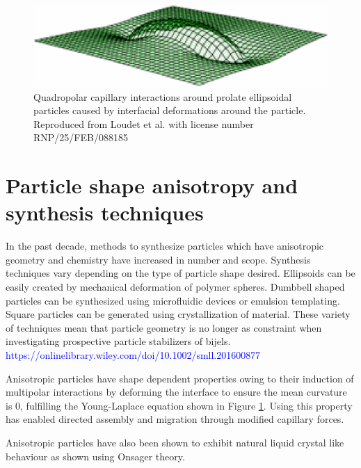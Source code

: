\begin{figure}
    \centering
    \includegraphics[scale = 0.5]{figures/literature_review/interfacial_curvature.png}
    \caption{Quadropolar capillary interactions around prolate ellipsoidal particles caused by interfacial deformations around the particle. 
    \cite{loudet_capillary_2005} Reproduced from Loudet et al. with license number RNP/25/FEB/088185}
    \label{fig:anisotropic_particle_interface}
\end{figure}

\section{Particle shape anisotropy and synthesis techniques}

In the past decade, methods to synthesize particles which have anisotropic geometry and chemistry have increased in number and scope. Synthesis techniques vary 
depending on the type of particle shape desired. Ellipsoids can be easily created by mechanical deformation of polymer spheres. Dumbbell shaped particles can be 
synthesized using microfluidic devices or emulsion templating. Square particles can be generated using crystallization of material. \cite{morgan_understanding_2013} 
These variety of techniques mean that particle geometry is no longer as constraint when investigating prospective particle stabilizers of bijels. 
\textcolor{blue}{https://onlinelibrary.wiley.com/doi/10.1002/smll.201600877}

Anisotropic particles have shape dependent properties owing to their induction of multipolar interactions by deforming the interface to ensure the mean 
curvature is 0,  fulfilling the Young-Laplace equation shown in Figure \ref{fig:anisotropic_particle_interface}. \cite{loudet_capillary_2005, 
cheng_shape-anisotropic_2013} Using this property has enabled directed assembly and migration through modified capillary forces. 
\cite{cavallaro_curvature-driven_2011, read_dimerization_2020, sharifi-mood_curvature_2015} 

Anisotropic particles have also been shown to exhibit natural liquid crystal like behaviour as shown using Onsager theory. 

